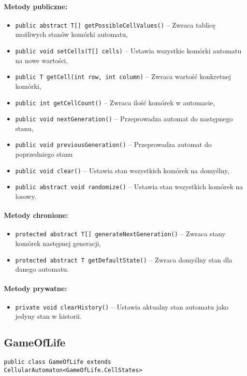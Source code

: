\documentclass{report}
\begin{document}
\paragraph{Metody publiczne:}
\begin{itemize}
	\item \texttt{public abstract T[] getPossibleCellValues()} -- Zwraca tablicę możliwych stanów komórki automatu,
	\item \texttt{public void setCells(T[] cells)} -- Ustawia wszystkie komórki automatu na nowe wartości,
	\item \texttt{public T getCell(int row, int column)} -- Zwraca wartość konkretnej komórki,
	\item \texttt{public int getCellCount()} -- Zwraca ilość komórek w automacie,
	\item \texttt{public void nextGeneration()} -- Przeprowadza automat do następnego stanu,
	\item \texttt{public void previousGeneration()} -- Przeprowadza automat do poprzedniego stanu
	\item \texttt{public void clear()} -- Ustawia stan wszystkich komórek na domyślny,
	\item \texttt{public abstract void randomize()} -- Ustawia stan wszystkich komórek na losowy.
\end{itemize}

\paragraph{Metody chronione:}
\begin{itemize}
	\item \texttt{protected abstract T[] generateNextGeneration()} -- Zwraca stany komórek następnej generacji,
	\item \texttt{protected abstract T getDefaultState()} -- Zwraca domyślny stan dla danego automatu.
\end{itemize}

\paragraph{Metody prywatne:}
\begin{itemize}
	\item \texttt{private void clearHistory()} -- Ustawia aktualny stan automatu jako jedyny stan w historii.
\end{itemize}

\subsection{GameOfLife}
\texttt{public class GameOfLife extends CellularAutomaton<GameOfLife.CellStates>}
\end{document}
